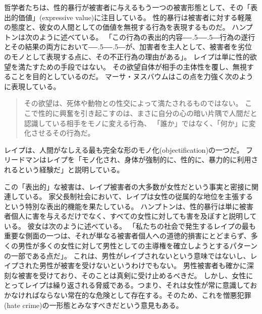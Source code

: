 \documentclass[paper=a4,book,openany]{jlreq}
\newcommand{\ig}[1]{}           %
\def\DDASH{―\kern-.5\zw―\kern-.5\zw―} %
\begin{document}
哲学者たちは、性的暴行が被害者に与えるもう一つの被害形態として、その「表出的価値」(expressive value)に注目している。
性的暴行は被害者に対する軽蔑の態度と、彼女の人間としての価値を無視する行為を表現するものだ。
ハンプトンは次のように述べている。
「この行為の表出的内容{\DDASH}行為の遂行とその結果の両方において{\DDASH}が、加害者を主人として、被害者を劣位のモノとして表現する点に、その不正行為の理由がある」\citep[p.135]{hampton99:_defin_wrong_and_defin_rape}。
レイプは単に性的欲望を満たすための手段ではない。
その欲望自体が相手の主体性を覆し、無視することを目的としているのだ。
マーサ・ヌスバウムはこの点を力強く次のように表現している。

\begin{quote}
その欲望は、死体や動物との性交によって満たされるものではない。
ここで性的に興奮を引き起こすのは、まさに自分の心の暗い片隅で人間だと認識している相手をモノに変える行為、
「誰か」ではなく、「何か」に変化させるその行為だ。
\citep[p.281]{nussbaum95:_objec}
\end{quote}

レイプは、人間がなしえる最も完全な形のモノ化(objectification)の一つだ。
フリードマン\ig{Karyn L. Freedman}はレイプを「モノ化され、身体が強制的に、性的に、暴力的に利用されるという経験だ」と説明している。

この「表出的」な被害は、レイプ被害者の大多数が女性だという事実と密接に関連している。
家父長制社会において、レイプは女性の従属的な地位を主張するという特別な表出的機能を果たしている。
ハンプトンは、性的暴行は単に被害者個人に害を与えるだけでなく、すべての女性に対しても害を及ぼすと説明している。
彼女は次のように述べている。
「私たちの社会で発生するレイプの最も重要な側面の一つは、それが単なる被害者個人への道徳的損害にとどまらず、多くの男性が多くの女性に対して男性としての主導権を確立しようとするパターンの一部である点だ」\citep[p.135]{hampton99:_defin_wrong_and_defin_rape}。
これは、男性がレイプされないという意味ではないし、レイプされた男性が被害を受けないというわけでもない。
男性被害者も確かに深刻な被害を受けており、そのことは真剣に受け止めるべきだ。
しかし、女性にとってレイプは繰り返される脅威である。つまり、それは女性が常に意識しておかなければならない常在的な危険として存在する。そのため、これを憎悪犯罪(hate crime)の一形態とみなすべきだという意見もある\citep{campo-engelstein16:_rape_hate_crime}。
\end{document}
